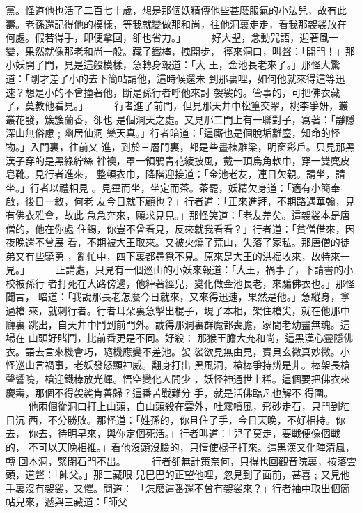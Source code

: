 \begin{pinyinscope}
{黨。怪道他也活了二百七十歲，想是那個妖精傳他些甚麼服氣的小法兒，故有此
壽。老孫還記得他的模樣，等我就變做那和尚，往他洞裏走走，看我那袈裟放在
何處。假若得手，即便拿回，卻也省力。」
　　
好大聖，念動咒語，迎著風一變，果然就像那老和尚一般。藏了鐵棒，拽開步，
徑來洞口，叫聲：「開門！」那小妖開了門，見是這般模樣，急轉身報道：「大
王，金池長老來了。」那怪大驚道：「剛才差了小的去下簡帖請他，這時候還未
到那裏哩，如何他就來得這等迅速？想是小的不曾撞著他，斷是孫行者呼他來討
袈裟的。管事的，可把佛衣藏了，莫教他看見。」
　　
行者進了前門，但見那天井中松篁交翠，桃李爭妍，叢叢花發，簇簇蘭香，卻也
是個洞天之處。又見那二門上有一聯對子，寫著：「靜隱深山無俗慮﹔幽居仙洞
樂天真。」行者暗道：「這廝也是個脫垢離塵，知命的怪物。」入門裏，往前又
進，到於三層門裏，都是些畫棟雕梁，明窗彩戶。只見那黑漢子穿的是黑綠紵絲
袢襖，罩一領鴉青花綾披風，戴一頂烏角軟巾，穿一雙麂皮皂靴。見行者進來，
整頓衣巾，降階迎接道：「金池老友，連日欠親。請坐，請坐。」行者以禮相見
。見畢而坐，坐定而茶。茶罷，妖精欠身道：「適有小簡奉啟，後日一敘，何老
友今日就下顧也？」行者道：「正來進拜，不期路遇華翰，見有佛衣雅會，故此
急急奔來，願求見見。」那怪笑道：「老友差矣。這袈裟本是唐僧的，他在你處
住錫，你豈不曾看見，反來就我看看？」行者道：「貧僧借來，因夜晚還不曾展
看，不期被大王取來。又被火燒了荒山，失落了家私。那唐僧的徒弟又有些驍勇
，亂忙中，四下裏都尋覓不見。原來是大王的洪福收來，故特來一見。」
　　
正講處，只見有一個巡山的小妖來報道：「大王，禍事了，下請書的小校被孫行
者打死在大路傍邊，他綽著經兒，變化做金池長老，來騙佛衣也。」那怪聞言，
暗道：「我說那長老怎麼今日就來，又來得迅速，果然是他。」急縱身，拿過槍
來，就刺行者。行者耳朵裏急掣出棍子，現了本相，架住槍尖，就在他那中廳裏
跳出，自天井中鬥到前門外。諕得那洞裏群魔都喪膽，家間老幼盡無魂。這場在
山頭好賭鬥，比前番更是不同。好殺：
那猴王膽大充和尚，這黑漢心靈隱佛衣。語去言來機會巧，隨機應變不差池。袈
裟欲見無由見，寶貝玄微真妙微。小怪巡山言禍事，老妖發怒顯神威。翻身打出
黑風洞，槍棒爭持辨是非。棒架長槍聲響喨，槍迎鐵棒放光輝。悟空變化人間少
，妖怪神通世上稀。這個要把佛衣來慶壽，那個不得袈裟肯善歸？這番苦戰難分
手，就是活佛臨凡也解不 得圍。
　　
他兩個從洞口打上山頭，自山頭殺在雲外，吐霧噴風，飛砂走石，只鬥到紅日沉
西，不分勝敗。那怪道：「姓孫的，你且住了手，今日天晚，不好相持。你去，
你去，待明早來，與你定個死活。」行者叫道：「兒子莫走，要戰便像個戰的，
不可以天晚相推。」看他沒頭沒臉的，只情使棍子打來。這黑漢又化陣清風，轉
回本洞，緊閉石門不出。
　　
行者卻無計策奈何，只得也回觀音院裏，按落雲頭，道聲：「師父。」那三藏眼
兒巴巴的正望他哩，忽見到了面前，甚喜﹔又見他手裏沒有袈裟，又懼。問道：
「怎麼這番還不曾有袈裟來？」行者袖中取出個簡帖兒來，遞與三藏道：「師父
}
\end{pinyinscope}

